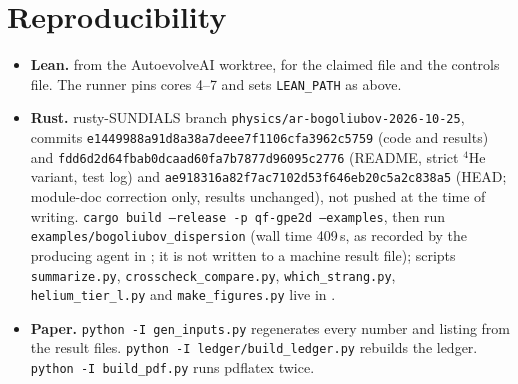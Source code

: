 \documentclass[11pt]{article}
\theoremstyle{remark}
\begin{document}
\section{Reproducibility}\label{sec:repro}
\begin{itemize}
\item \textbf{Lean.}
 from the
AutoevolveAI worktree, for the claimed file and the controls file. The runner pins cores 4--7 and sets
\texttt{LEAN\_PATH} as above.
\item \textbf{Rust.} rusty-SUNDIALS branch \texttt{physics/ar-bogoliubov-2026-10-25}, commits
\texttt{e1449988a91d8a38a7deee7f1106cfa3962c5759} (code and results) and
\texttt{fdd6d2d64fbab0dcaad60fa7b7877d96095c2776} (README, strict $^4$He variant, test log) and
\texttt{ae918316a82f7ac7102d53f646eb20c5a2c838a5} (HEAD; module-doc correction only, results unchanged), not pushed at
the time of writing.
\texttt{cargo build --release -p qf-gpe2d --examples}, then run
\texttt{examples/bogoliubov\_dispersion} (wall time 409\,s, as recorded by the producing agent in
; it is not written to a machine result file); scripts \texttt{summarize.py}, \texttt{crosscheck\_compare.py},
\texttt{which\_strang.py}, \texttt{helium\_tier\_l.py} and \texttt{make\_figures.py} live in
.
\item \textbf{Paper.} \texttt{python -I gen\_inputs.py} regenerates every number and listing from the result files.
\texttt{python -I ledger/build\_ledger.py} rebuilds the ledger. \texttt{python -I build\_pdf.py} runs pdflatex twice.
\end{itemize}
\end{document}
